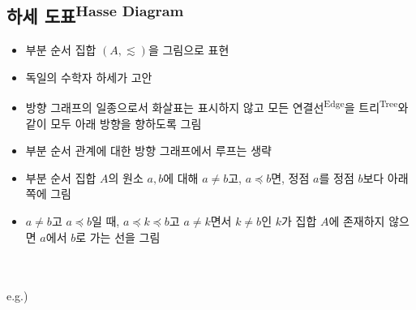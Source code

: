 \subsection{하세 도표\textsuperscript{Hasse Diagram}}
\begin{itemize}
    \item 부분 순서 집합 $(A, \lesssim)$을 그림으로 표현
    \item 독일의 수학자 하세가 고안
    \item 방향 그래프의 일종으로서 화살표는 표시하지 않고 모든 연결선\textsuperscript{Edge}을 트리\textsuperscript{Tree}와 같이 모두 아래 방향을 향하도록 그림
    \item 부분 순서 관계에 대한 방향 그래프에서 루프는 생략
    \item 부분 순서 집합 $A$의 원소 $a, b$에 대해 $a \neq b$고, $a\preccurlyeq b$면, 정점 $a$를 정점 $b$보다 아래쪽에 그림
    \item $a \neq b$고 $a \preccurlyeq b$일 때, $a \preccurlyeq k \preccurlyeq b$고 $a \neq k$면서 $k \neq b$인 $k$가 집합 $A$에 존재하지 않으면 $a$에서 $b$로 가는 선을 그림
\end{itemize}\phantom{}\\\\
e.g.)

